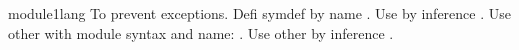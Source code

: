 \begin{mhmodnl}[creators=marian]{module1}{lang}
    To prevent exceptions.
    Defi symdef by name .
    Use by inference .
    Use other with module syntax and name: .
    Use other by inference .
\end{mhmodnl}
